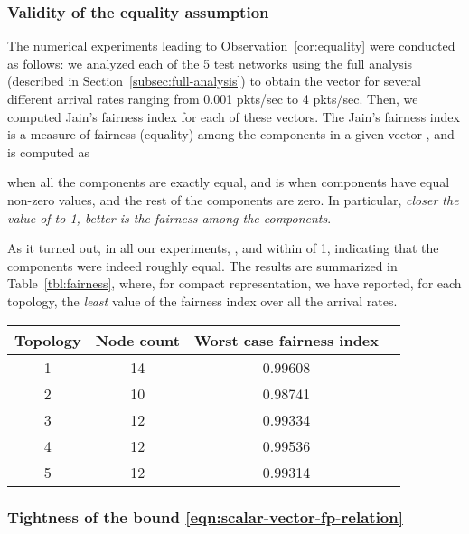 \documentclass[12pt, draftclsnofoot, onecolumn]{IEEEtran}
\begin{document}
\subsubsection{Validity of the equality assumption}
\label{subsubsec:equality-validation}
The numerical experiments leading to Observation~\ref{cor:equality} were conducted as follows: we analyzed each of the 5 test networks using the full analysis (described in Section~\ref{subsec:full-analysis}) to obtain the vector  for several different arrival rates ranging from 0.001 pkts/sec to 4 pkts/sec. Then, we computed Jain's fairness index \cite{fairness-ix} for each of these vectors. The Jain's fairness index is a measure of fairness (equality) among the components in a given vector , and is computed as 


 when all the components are exactly equal, and is  when  components have equal non-zero values, and the rest of the components are zero. In particular, \emph{closer the value of  to 1, better is the fairness among the components}. 

As it turned out, in all our experiments, , and within  of 1, indicating that the components were indeed roughly equal. The results are summarized in Table~\ref{tbl:fairness}, where, for compact representation, we have reported, for each topology, the \emph{least} value of the fairness index over all the arrival rates.

\begin{table*}[ht]
  \centering
\caption{Validation of Observation~\ref{cor:equality}, using Jain's Fairness Index; fairness index of 1 implies exact equality}
\label{tbl:fairness}
\footnotesize
  \begin{tabular}{|c|c|c|c|}\hline
    Topology & Node count & Worst case fairness index\\
   \hline
   1 & 14 & 0.99608\\
   \hline
   2 & 10 & 0.98741\\	
  \hline
   3 & 12 & 0.99334\\
  \hline
   4 & 12 & 0.99536\\
  \hline
   5 & 12 & 0.99314\\   
  \hline
\end{tabular}
\normalsize
\end{table*}

\subsubsection{Tightness of the bound \eqref{eqn:scalar-vector-fp-relation}}
\label{subsubsec:upper-bound-validation}
\end{document}
